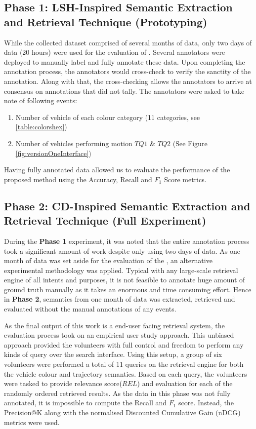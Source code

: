 \subsection{Phase 1: LSH-Inspired Semantic Extraction and Retrieval Technique (Prototyping)}
While the collected dataset comprised of several months of data, only two days of data (20 hours) were used for the evaluation of \versionOneRet. Several annotators were deployed to manually label and fully annotate these data. Upon completing the annotation process, the annotators would cross-check to verify the sanctity of the annotation. Along with that, the cross-checking allows the annotators to arrive at consensus on annotations that did not tally. The annotators were asked to take note of following events:
\begin{enumerate}
    \item Number of vehicle of each colour category (11 categories, see \ref{table:colorshex})
    \item Number of vehicles performing motion $TQ1$ \& $TQ2$ (See Figure \ref{fig:versionOneInterface})
\end{enumerate}

Having fully annotated data allowed us to evaluate the performance of the proposed method using the Accuracy, Recall and $F_1$ Score metrics.

\subsection{Phase 2: CD-Inspired Semantic Extraction and Retrieval Technique (Full Experiment)}

During the \textbf{Phase 1} experiment, it was noted that the entire annotation process took a significant amount of work despite only using two days of data. As one month of data was set aside for the evaluation of the \versionTwoRet, an alternative experimental methodology was applied.
Typical with any large-scale retrieval engine of all intents and purposes, it is not feasible to annotate huge amount of ground truth manually as it takes an enormous and time consuming effort.
Hence in \textbf{Phase 2}, semantics from one month of data was extracted, retrieved and evaluated without the manual annotations of any events.

As the final output of this work is a end-user facing retrieval system, the evaluation process took on an empirical user study approach. This unbiased approach provided the volunteers with full control and freedom to perform any kinds of query over the search interface.
Using this setup, a group of six volunteers were performed a total of 11 queries on the retrieval engine for both the vehicle colour and trajectory semantics.
Based on each query, the volunteers were tasked to provide relevance score($REL$) and evaluation for each of the randomly ordered retrieved results.
As the data in this phase was not fully annotated, it is impossible to compute the Recall and $F_1$ score. Instead, the Precision@K along with the normalised Discounted Cumulative Gain (nDCG) metrics were used.

